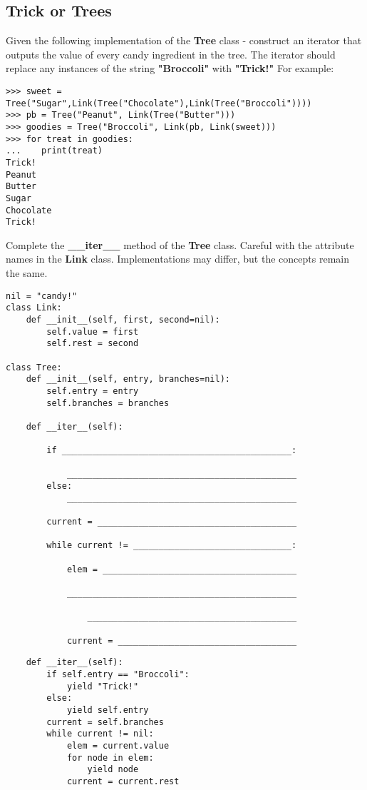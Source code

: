 \subsection*{Trick or Trees}
\begin{questions}
\question Given the following implementation of the \textbf{Tree} class - construct an iterator that outputs the value of every candy ingredient in the tree. The iterator should replace any instances of the string \textbf{"Broccoli"} with \textbf{"Trick!"}  For example:
\begin{lstlisting}
>>> sweet = Tree("Sugar",Link(Tree("Chocolate"),Link(Tree("Broccoli"))))
>>> pb = Tree("Peanut", Link(Tree("Butter")))
>>> goodies = Tree("Broccoli", Link(pb, Link(sweet)))
>>> for treat in goodies:
...    print(treat)
Trick!
Peanut
Butter 
Sugar
Chocolate 
Trick!
\end{lstlisting}

Complete the \textbf{\_\_iter\_\_} method of the \textbf{Tree} class. Careful with the attribute names in the \textbf{Link} class. Implementations may differ, but the concepts remain the same.

\begin{lstlisting}
nil = "candy!"
class Link:
    def __init__(self, first, second=nil):
        self.value = first
        self.rest = second

class Tree:  
    def __init__(self, entry, branches=nil):
        self.entry = entry
        self.branches = branches

    def __iter__(self):
    
        if _____________________________________________:
        
            _____________________________________________
        else:
            _____________________________________________
            
        current = _______________________________________
        
        while current != _______________________________:
            
            elem = ______________________________________
            
            _____________________________________________
                
                _________________________________________
            
            current = ___________________________________
\end{lstlisting}



\begin{solution}
\begin{lstlisting}
    def __iter__(self):
        if self.entry == "Broccoli":
            yield "Trick!"
        else:
            yield self.entry
        current = self.branches
        while current != nil:
            elem = current.value
            for node in elem:
                yield node
            current = current.rest
\end{lstlisting}
\end{solution}

\end{questions}


